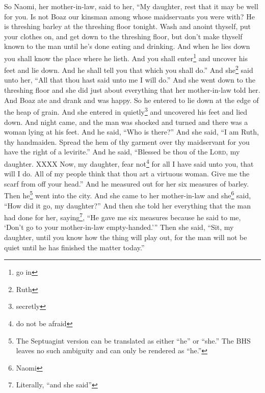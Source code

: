 
\begin{enumerate*}[mode=unboxed]
     So Naomi, her mother-in-law, said to her, ``My daughter, rest that it may be well for you.%
     Is not Boaz our kinsman among whose maidservants you were with? He is threshing barley at the threshing floor tonight.%
     Wash and anoint thyself, put your clothes on, and get down to the threshing floor, but don't make thyself known to the man until he's done eating and drinking.%
     And when he lies down you shall know the place where he lieth. And you shall enter\footnote{go in} and uncover his feet and lie down. And he shall tell you that which you shall do.''%
     And she\footnote{Ruth} said unto her, ``All that thou hast said unto me I will do.''%
     And she went down to the threshing floor and she did just about everything that her mother-in-law told her.%
     And Boaz ate and drank and was happy. So he entered to lie down at the edge of the heap of grain. And she entered in quietly\footnote{secretly} and uncovered his feet and lied down.%
     And night came, and the man was shocked and turned and there was a woman lying at his feet.%
     And he said, ``Who is there?'' And she said, ``I am Ruth, thy handmaiden. Spread the hem of thy garment over thy maidservant for you have the right of a levirite.''%
     And he said, ``Blessed be thou of the \textsc{Lord}, my daughter. XXXX%
     Now, my daughter, fear not\footnote{do not be afraid} for all I have said unto you, that will I do. All of my people think that thou art a virtuous woman.%
     Give me the scarf from off your head.'' And he measured out for her six measures of barley. Then he\footnote{The Septuagint version can be translated as either ``he'' or ``she.'' The BHS leaves no such ambiguity and can only be rendered as ``he.''} went into the city.%
     And she came to her mother-in-law and she\footnote{Naomi} said, ``How did it go, my daughter?'' And then she told her everything that the man had done for her,%
     saying\footnote{Literally, ``and she said''}, ``He gave me six measures because he said to me, `Don't go to your mother-in-law empty-handed.'''%
     Then she said, ``Sit, my daughter, until you know how the thing will play out, for the man will not be quiet until he has finished the matter today.''%
\end{enumerate*}
